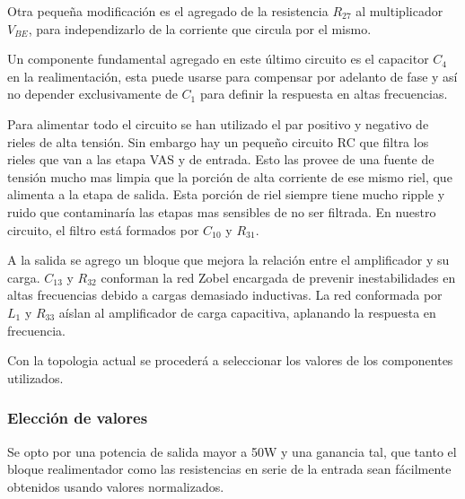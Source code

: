 Otra pequeña modificación es el agregado de la resistencia $R_{27}$ al multiplicador $V_{BE}$, para independizarlo de la corriente que circula por el mismo.

Un componente fundamental agregado en este último circuito es el capacitor $C_4$ en la realimentación, esta puede usarse para compensar por adelanto de fase y así no depender exclusivamente de $C_1$ para definir la respuesta en altas frecuencias.

Para alimentar todo el circuito se han utilizado el par positivo y negativo de rieles de alta tensión. Sin embargo hay un pequeño circuito RC que filtra los rieles que van a las etapa VAS y de entrada. Esto las provee de una fuente de tensión mucho mas limpia que la porción de alta corriente de ese mismo riel, que alimenta a la etapa de salida. Esta porción de riel siempre tiene mucho ripple y ruido que contaminaría las etapas mas sensibles de no ser filtrada. En nuestro circuito, el filtro está formados por $C_{10}$ y $R_{31}$.

A la salida se agrego un bloque que mejora la relación entre el amplificador y su carga. $C_{13}$ y $R_{32}$ conforman la red Zobel encargada de prevenir inestabilidades en altas frecuencias debido a cargas demasiado inductivas. La red conformada por $L_{1}$ y $R_{33}$ aíslan al amplificador de carga capacitiva, aplanando la respuesta en frecuencia.

Con la topologia actual se procederá a seleccionar los valores de los componentes utilizados. 
\medskip
\subsubsection{Elección de valores}

Se opto por una potencia de salida mayor a 50W y una ganancia tal, que tanto el bloque realimentador como las resistencias en serie de la entrada sean fácilmente obtenidos usando valores normalizados.



